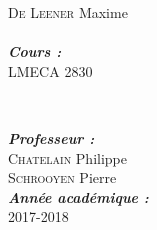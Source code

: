 \begin{titlepage}
\begin{minipage}{0.4\textwidth}
\begin{flushleft}
\textsc{De Leener} Maxime\\

\\[0,4cm]
\emph{\textbf{Cours :\ }}\\\textsc{\large LMECA 2830}\\[0.4cm] %


\end{flushleft}
\end{minipage}
~
\begin{minipage}{0.4\textwidth}
\begin{flushright} \large

\emph{\textbf{Professeur :}} \\
\textsc{Chatelain} Philippe\\
\textsc{Schrooyen} Pierre\\ [0,4cm]

\emph{\textbf{Année académique :\ }}\\\textsc{\large 2017-2018}\\[0.4cm] %


\end{flushright}
\end{minipage}\\[0cm]


~
\begin{minipage}{0.4\textwidth}

\end{minipage}

\vfill %

\end{titlepage}